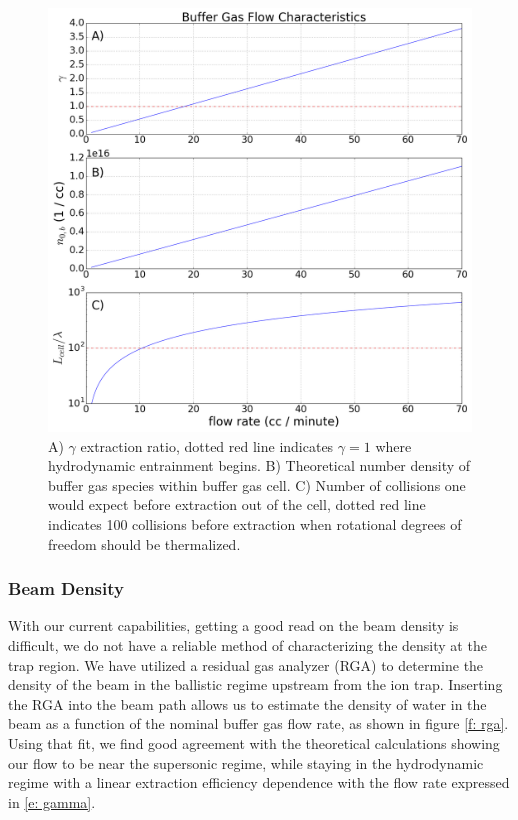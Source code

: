 \documentclass[a4paper]{article}
\begin{document}
\begin{figure} [H]
\centering
\includegraphics[width=1\textwidth]{CBGB_flow_characteristic.png}
\caption{A) $\gamma$ extraction ratio, dotted red line indicates $\gamma = 1$ where hydrodynamic entrainment begins. B) Theoretical number density of buffer gas species within buffer gas cell. C) Number of collisions one would expect before extraction out of the cell, dotted red line indicates 100 collisions before extraction when rotational degrees of freedom should be thermalized.}
\label{f: buffer_gas_flow}
\end{figure}

\subsubsection{Beam Density}

With our current capabilities, getting a good read on the beam density is difficult, we do not have a reliable method of characterizing the density at the trap region. We have utilized a residual gas analyzer (RGA) to determine the density of the beam in the ballistic regime upstream from the ion trap. Inserting the RGA into the beam path allows us to estimate the density of water in the beam as a function of the nominal buffer gas flow rate, as shown in figure \ref{f: rga}. Using that fit, we find good agreement with the theoretical calculations showing our flow to be near the supersonic regime, while staying in the hydrodynamic regime with a linear extraction efficiency dependence with the flow rate expressed in \ref{e: gamma}.
\end{document}
